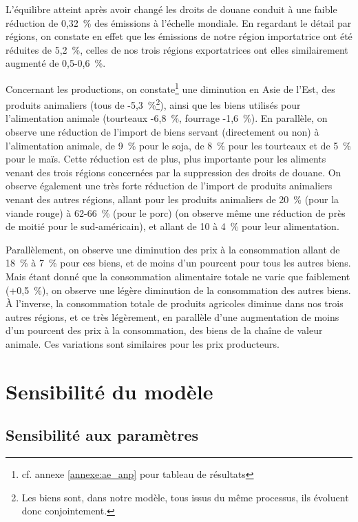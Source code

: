 L'équilibre atteint après avoir changé les droits de douane conduit à une faible réduction de 0,32~\% des émissions à l'échelle mondiale. En regardant le détail par régions, on constate en effet que les émissions de notre région importatrice ont été réduites de 5,2~\%, celles de nos trois régions exportatrices ont elles similairement augmenté de 0,5-0,6~\%.

Concernant les productions, on constate\footnote{cf. annexe \ref{annexe:ae_anp} pour tableau de résultats} une diminution en Asie de l'Est, des produits animaliers (tous de -5,3~\%\footnote{Les biens sont, dans notre modèle, tous issus du même processus, ils évoluent donc conjointement.}), ainsi que les biens utilisés pour l'alimentation animale (tourteaux -6,8~\%, fourrage -1,6~\%). En parallèle, on observe une réduction de l'import de biens servant (directement ou non) à l'alimentation animale, de 9~\% pour le soja, de 8~\% pour les tourteaux et de 5~\% pour le maïs. Cette réduction est de plus, plus importante pour les aliments venant des trois régions concernées par la suppression des droits de douane. On observe également une très forte réduction de l'import de produits animaliers venant des autres régions, allant pour les produits animaliers de 20~\% (pour la viande rouge) à 62-66~\% (pour le porc) (on observe même une réduction de près de moitié pour le sud-américain), et allant de 10 à 4~\% pour leur alimentation.

Parallèlement, on observe une diminution des prix à la consommation allant de 18~\% à 7~\% pour ces biens, et de moins d'un pourcent pour tous les autres biens. Mais étant donné que la consommation alimentaire totale ne varie que faiblement (+0,5~\%), on observe une légère diminution de la consommation des autres biens. À l'inverse, la consommation totale de produits agricoles diminue dans nos trois autres régions, et ce très légèrement, en parallèle d'une augmentation de moins d'un pourcent des prix à la consommation, des biens de la chaîne de valeur animale. Ces variations sont similaires pour les prix producteurs.


\section{Sensibilité du modèle}

\subsection{Sensibilité aux paramètres}


